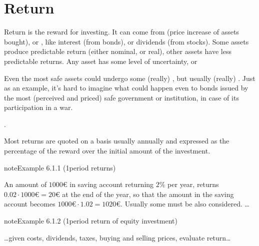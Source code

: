 \documentclass[letterpaper,10pt,english]{jupyterBook}
\begin{document}
\section{Return}
\label{\detokenize{ch/principles/intro_nb:return}}\label{\detokenize{ch/principles/intro_nb:fin-edu-principles-return}}
\sphinxAtStartPar
Return is the reward for investing. It can come from  (price increase of assets bought), or , like interest (from bonds), or dividends (from stocks). Some assets produce predictable return (either nominal, or real), other assets have less predictable returns. Any asset has some level of uncertainty, or {\hyperref[\detokenize{ch/principles/intro_nb:fin-edu-principles-rr}]{}}%
\begin{footnote}[1]\sphinxAtStartFootnote
Even the most safe assets could undergo some (really) , but usually (really) . Just as an example, it’s hard to imagine what could happen even to bonds issued by the most (perceived and priced) safe government or institution, in case of its participation in a war.
%
\end{footnote}.

\sphinxAtStartPar
Most returns are quoted on a  basis \sphinxhyphen{} usually annually \sphinxhyphen{} and expressed as the percentage of the reward over the initial amount of the investment.
\label{ch/principles/intro_nb:example-0}
\begin{sphinxadmonition}{note}{Example 6.1.1 (1\sphinxhyphen{}period returns)}



\sphinxAtStartPar
An amount of \(1000\)€ in saving account returning \(2\%\) per year, returns \(0.02 \cdot 1000\text{€} = 20\)€ at the end of the year, so that the amount in the saving account becomes \(1000\text{€} \cdot 1.02 = 1020\text{€}\). Usually some {\hyperref[\detokenize{ch/principles/intro_nb:fin-edu-principles-return-costs}]{}} must be also considered.
…
\end{sphinxadmonition}
\label{ch/principles/intro_nb:example-1}
\begin{sphinxadmonition}{note}{Example 6.1.2 (1\sphinxhyphen{}period return of equity investment)}



\sphinxAtStartPar
…given costs, dividends, taxes, buying and selling prices, evaluate return…
\end{sphinxadmonition}
\end{document}
